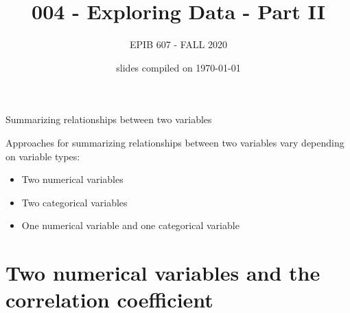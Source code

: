 \documentclass[10pt,handout]{beamer}\usepackage[]{graphicx}\usepackage[]{color}
\begin{document}
	
	
	
	
	\title{004 - Exploring Data - Part II}
	\author{EPIB 607 - FALL 2020}
	
	\date{slides compiled on \today}
	
	\maketitle

	
	

						
\begin{frame}{Summarizing relationships between two variables}
							\protect\hypertarget{summarizing-relationships-between-two-variables}{}
							
							Approaches for summarizing relationships between two variables vary
							depending on variable types:
							
							\begin{itemize}
								\item
								Two numerical variables
								\item
								Two categorical variables
								\item
								One numerical variable and one categorical variable
							\end{itemize}
							
\end{frame}


\section{Two numerical variables and the correlation coefficient}
\end{document}
